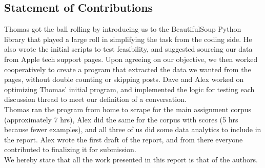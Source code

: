 \documentclass[10pt]{article}
\begin{document}
\begin{multicols}{2}



\section{Statement of Contributions}
Thomas got the ball rolling by introducing us to the BeautifulSoup Python library that played a large roll in simplifying the task from the coding side. He also wrote the initial scripts to test feasibility, and suggested sourcing our data from Apple tech support pages. Upon agreeing on our objective, we then worked cooperatively to create a program that extracted the data we wanted from the pages, without double counting or skipping posts. Dave and Alex worked on optimizing Thomas' initial program, and implemented the logic for testing each discussion thread to meet our definition of a conversation. \\

Thomas ran the program from home to scrape for the main assignment corpus (approximately 7 hrs), Alex did the same for the corpus with scores (5 hrs because fewer examples), and all three of us did some data analytics to include in the report. Alex wrote the first draft of the report, and from there everyone contributed to finalizing it for submission.\\

We hereby state that all the work presented in this report is that of the authors.



\end{multicols}
\end{document}

